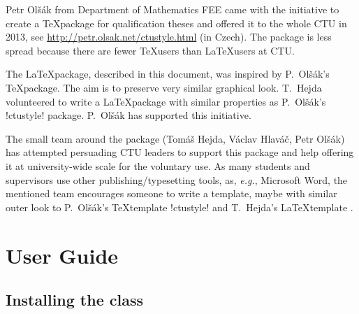 \documentclass[twoside,11pt]{ctuthesis}
\theoremstyle{plain}
\theoremstyle{definition}
\theoremstyle{note}
\begin{document}
Petr Olšák from Department of Mathematics FEE came with the initiative to create a \TeX\@ package for qualification theses and offered it to the whole CTU in 2013, see \url{http://petr.olsak.net/ctustyle.html} (in Czech). The package is less spread because there are fewer \TeX\@ users than \LaTeX\@ users at CTU.

The \ctuclsname\@ \LaTeX\@ package, described in this document, was inspired by P.~Olšák's \TeX\@ package. The aim is to preserve very similar graphical look. T.~Hejda volunteered to write a \LaTeX\@ package with similar properties as P.~Olšák's \ctulst!ctustyle! package. P.~Olšák has supported this initiative.

The small team around the \ctuclsname\@ package (Tomáš Hejda, Václav Hlaváč, Petr Olšák) has attempted persuading CTU leaders to support this package and help offering it at university-wide scale for the voluntary use. As many students and supervisors use other publishing/typesetting tools, as, \emph{e.g.}, Microsoft Word, the mentioned team encourages someone to write a template, maybe with similar outer look to P.~Olšák's \TeX\@ template \ctulst!ctustyle! and T.~Hejda's \LaTeX\@ template \ctuclsname. 






\chapter{User Guide}
\label{chap:ug}





\section{Installing the class}
\end{document}
